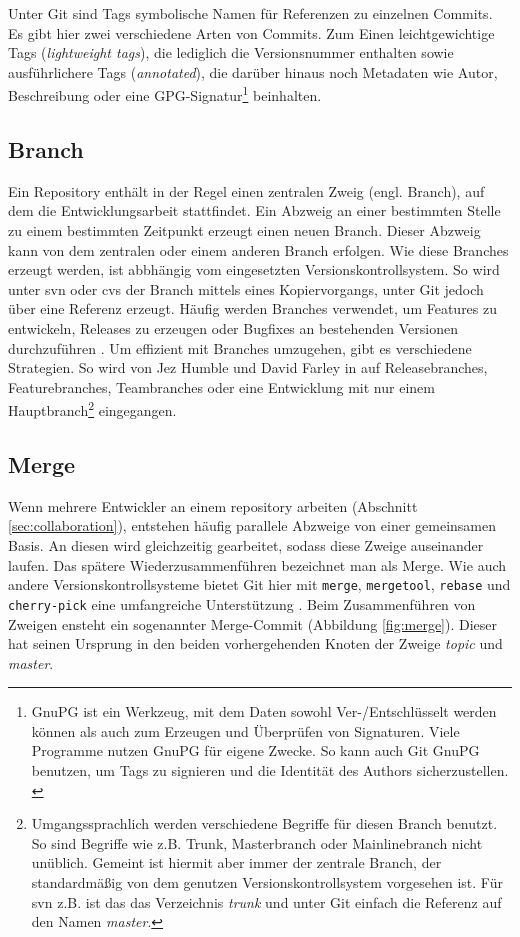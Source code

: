 Unter Git sind Tags symbolische Namen für Referenzen zu einzelnen Commits. Es
gibt hier zwei verschiedene Arten von Commits. Zum Einen leichtgewichtige Tags
(\textit{lightweight tags}), die lediglich die Versionsnummer enthalten sowie
ausführlichere Tags (\textit{annotated}), die darüber hinaus noch Metadaten wie
Autor, Beschreibung oder eine GPG-Signatur\footnote{GnuPG ist ein Werkzeug, mit
dem Daten sowohl Ver-/Entschlüsselt werden können als auch zum Erzeugen und
Überprüfen von Signaturen. Viele Programme nutzen GnuPG für eigene Zwecke. So
kann auch Git GnuPG benutzen, um Tags zu signieren und die Identität des Authors
sicherzustellen. \cite{gnupg}}
beinhalten. \cite[S.~21]{gitosp}

\subsection{Branch}\label{sec:branch}
Ein Repository enthält in der Regel einen zentralen Zweig (engl. Branch),
auf dem die Entwicklungsarbeit stattfindet. Ein Abzweig an einer bestimmten
Stelle zu einem bestimmten Zeitpunkt erzeugt einen neuen Branch. Dieser
Abzweig kann von dem zentralen oder einem anderen Branch erfolgen. Wie diese
Branches erzeugt werden, ist abbhängig vom eingesetzten Versionskontrollsystem.
So wird unter \acrshort{svn} oder \acrshort{cvs} der Branch mittels
eines Kopiervorgangs, unter Git jedoch über eine Referenz erzeugt. Häufig
werden Branches verwendet, um Features zu entwickeln, Releases zu erzeugen oder
Bugfixes an bestehenden Versionen durchzuführen \cite[S.~21]{gitosp}. Um
effizient mit Branches umzugehen, gibt es verschiedene Strategien. So wird von
Jez Humble und David Farley in \cite[S.~408-412]{cd} auf Releasebranches,
Featurebranches, Teambranches oder eine Entwicklung mit nur einem
Hauptbranch\footnote{Umgangssprachlich werden verschiedene Begriffe für diesen
Branch benutzt. So sind Begriffe wie z.B. Trunk, Masterbranch oder
Mainlinebranch nicht unüblich. Gemeint ist hiermit aber immer der
zentrale Branch, der standardmäßig von dem genutzen Versionskontrollsystem vorgesehen
ist. Für \acrshort{svn} z.B. ist das das Verzeichnis
\textit{trunk} und unter Git einfach die Referenz auf den Namen
\textit{master}.} eingegangen.

\subsection{Merge}\label{sec:merge}
Wenn mehrere Entwickler an einem \gls{repository} arbeiten (Abschnitt
\ref{sec:collaboration}), entstehen häufig parallele Abzweige von einer
gemeinsamen Basis. An diesen wird gleichzeitig gearbeitet, sodass diese Zweige
auseinander laufen. Das spätere Wiederzusammenführen bezeichnet man als Merge.
Wie auch andere Versionskontrollsysteme bietet Git hier mit \texttt{merge},
\texttt{mergetool}, \texttt{rebase} und \texttt{cherry-pick} eine umfangreiche
Unterstützung \cite[S.~vii]{gitwf}. Beim Zusammenführen von Zweigen ensteht ein
sogenannter Merge-Commit (Abbildung \ref{fig:merge}). Dieser hat seinen
Ursprung in den beiden vorhergehenden Knoten der Zweige \textit{topic} und
\textit{master}.

